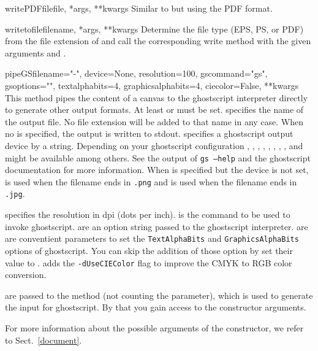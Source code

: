 \begin{methoddesc}{writePDFfile}{file, *args, **kwargs}
  Similar to  but using the PDF format.
\end{methoddesc}

\begin{methoddesc}{writetofile}{filename, *args, **kwargs}
  Determine the file type (EPS, PS, or PDF) from the file extension
  of  and call the corresponding write method with
  the given arguments  and .
\end{methoddesc}

\begin{methoddesc}{pipeGS}{filename="-", device=None, resolution=100,
                           gscommand="gs", gsoptions="",
                           textalphabits=4, graphicsalphabits=4,
                           ciecolor=False, **kwargs}
  This method pipes the content of a canvas to the ghostscript
  interpreter directly to generate other output formats. At least
   or  must be set.  specifies
  the name of the output file. No file extension will be added to that
  name in any case. When no  is specified, the output is
  written to stdout.  specifies a ghostscript output
  device by a string. Depending on your ghostscript configuration
  , , , ,
  , , ,
  , and  might be available among
  others. See the output of \texttt{gs --help} and the ghostscript
  documentation for more information. When  is specified
  but the device is not set,  is used when the filename
  ends in \texttt{.png} and  is used when the filename
  ends in \texttt{.jpg}.

   specifies the resolution in dpi (dots per inch).
   is the command to be used to invoke ghostscript.
   are an option string passed to the ghostscript
  interpreter.  are  are
  conventient parameters to set the \texttt{TextAlphaBits} and
  \texttt{GraphicsAlphaBits} options of ghostscript. You can skip
  the addition of those option by set their value to .
   adds the \texttt{-dUseCIEColor} flag to improve
  the CMYK to RGB color conversion.

   are passed to the  method (not
  counting the  parameter), which is used to generate the
  input for ghostscript. By that you gain access to the
   constructor arguments.
\end{methoddesc}

For more information about the possible arguments of the
 constructor, we refer to Sect.~\ref{document}.

